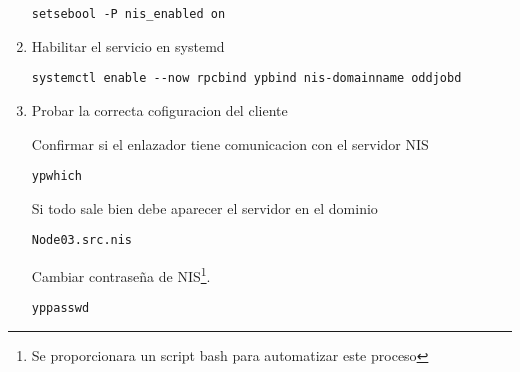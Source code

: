\documentclass[../main.tex]{subfiles}
\begin{document}
\begin{enumerate}
  \begin{lstlisting}
setsebool -P nis_enabled on 
\end{lstlisting}

\item Habilitar el servicio en systemd
  \begin{lstlisting}
systemctl enable --now rpcbind ypbind nis-domainname oddjobd 
\end{lstlisting}

\item Probar la correcta cofiguracion del cliente

  Confirmar si el enlazador tiene comunicacion con el servidor NIS

  \begin{lstlisting}
ypwhich
\end{lstlisting}

Si todo sale bien debe aparecer el servidor en el dominio

\begin{lstlisting}
Node03.src.nis
\end{lstlisting}

Cambiar contraseña de NIS\footnote{Se proporcionara un script bash para automatizar este proceso}.

\begin{lstlisting}
yppasswd
\end{lstlisting}
\end{enumerate}
\end{document}
